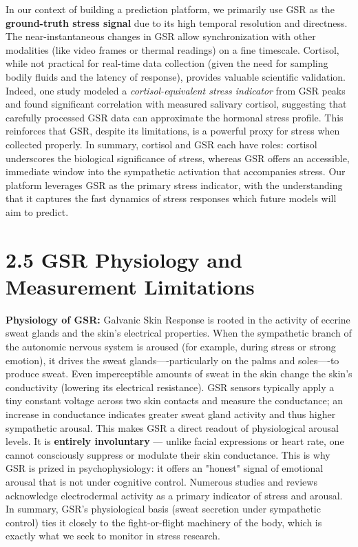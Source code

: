 In our context of building a prediction platform, we primarily use GSR
as the \textbf{ground-truth stress signal} due to its high temporal
resolution and directness. The near-instantaneous changes in GSR allow
synchronization with other modalities (like video frames or thermal
readings) on a fine timescale. Cortisol, while not practical for
real-time data collection (given the need for sampling bodily fluids and
the latency of response), provides valuable scientific validation.
Indeed, one study modeled a \textit{cortisol-equivalent stress indicator} from
GSR peaks and found significant correlation with measured salivary
cortisol\cite{CortisolStressIndicator2020},
suggesting that carefully processed GSR data can approximate the
hormonal stress profile. This reinforces that GSR, despite its
limitations, is a powerful proxy for stress when collected properly. In
summary, cortisol and GSR each have roles: cortisol underscores the
biological significance of stress, whereas GSR offers an accessible,
immediate window into the sympathetic activation that accompanies
stress. Our platform leverages GSR as the primary stress indicator, with
the understanding that it captures the fast dynamics of stress responses
which future models will aim to predict.

\section{2.5 GSR Physiology and Measurement Limitations}

\textbf{Physiology of GSR:} Galvanic Skin Response is rooted in the activity
of eccrine sweat glands and the skin's electrical properties. When the
sympathetic branch of the autonomic nervous system is aroused (for
example, during stress or strong emotion), it drives the sweat
glands----particularly on the palms and soles----to produce
sweat\cite{DeviceServer}.
Even imperceptible amounts of sweat in the skin change the skin's
conductivity (lowering its electrical resistance). GSR sensors typically
apply a tiny constant voltage across two skin contacts and measure the
conductance; an increase in conductance indicates greater sweat gland
activity and thus higher sympathetic
arousal\cite{GSRGuideIMotions}.
This makes GSR a direct readout of physiological arousal levels. It is
\textbf{entirely involuntary} --- unlike facial expressions or heart rate, one
cannot consciously suppress or modulate their skin conductance. This is
why GSR is prized in psychophysiology: it offers an "honest" signal of
emotional arousal that is not under cognitive control. Numerous studies
and reviews acknowledge electrodermal activity as a primary indicator of
stress and
arousal\cite{GSRPPGMachineLearning2024}.
In summary, GSR's physiological basis (sweat secretion under sympathetic
control) ties it closely to the fight-or-flight machinery of the body,
which is exactly what we seek to monitor in stress research.

